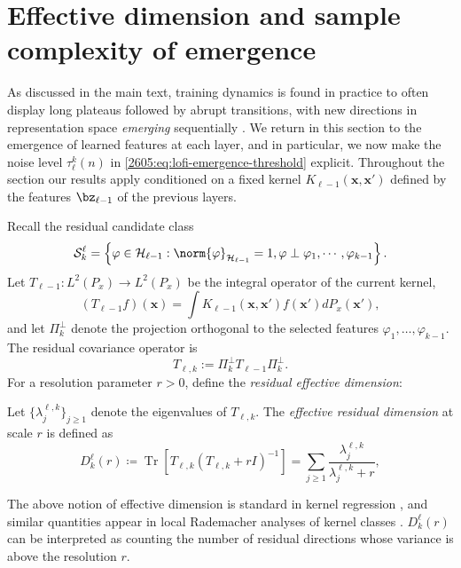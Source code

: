 \section{Effective dimension and sample complexity of emergence}

\label{2605:app:effective-dimension}

As discussed in the main text,  training dynamics is found in practice to often display long plateaus followed by abrupt transitions, with new directions in representation space \emph{emerging} sequentially \cite{wei2022emergent,raventos2023pretraining,arora2023theory,schaeffer2023are}. We return in this section to the emergence of learned features at each layer, and in particular, we now make the noise level \(\tau^k_\ell(n)\) in \eqref{2605:eq:lofi-emergence-threshold} explicit.  Throughout the section our results apply conditioned on a fixed kernel $K_{\ell-1}(\bm x,\bm x')$ defined by the features $\bz_{\ell-1}$ of the previous layers.

Recall the residual candidate class
\[
  \mathcal{S}^\ell_{k}
  =
  \left\{
  \varphi\in\mathcal H_{\ell-1}:
  \norm{\varphi}_{\mathcal H_{\ell-1}}=1, 
  \varphi \perp \varphi_1,\cdots, \varphi_{k-1}
  \right\}.
\]
Let \(T_{\ell-1}:L^2(P_x)\to L^2(P_x)\) be the integral operator of the current kernel,
\[
    (T_{\ell-1}f)(\bm x)
    =
    \int K_{\ell-1}(\bm x,\bm x')f(\bm x') dP_x(\bm x'),
\]
and let \(\Pi^\perp_k\) denote the projection orthogonal to the selected features \(\varphi_1,\dots,\varphi_{k-1}\). The residual covariance operator is
\[
    T_{\ell,k}
    :=
    \Pi^\perp_k T_{\ell-1}\Pi^\perp_k .
\]
For a resolution parameter \(r>0\), define the {\it residual effective dimension}:
\begin{definition}
    \label{2605:def:lofi-effective-dimension}
Let  \(\{\lambda^{\ell,k}_j\}_{j\geq 1}\) denote the eigenvalues of \(T_{\ell,k}\). The \emph{effective residual dimension} at scale \(r\) is defined as
    \begin{equation}
    D^\ell_k(r)
    \coloneqq
    \operatorname{Tr} \left[
        T_{\ell,k}(T_{\ell,k}+r I)^{-1}
    \right]
    =
    \sum_{j\geq 1}
    \frac{\lambda^{\ell,k}_j}{\lambda^{\ell,k}_j+r},
    \label{2605:eq:lofi-effective-dimension}
\end{equation}
\end{definition}
The above notion of effective dimension is standard in kernel regression
\cite{caponnetto2007optimal,rudi2017generalization}, and similar quantities
appear in local Rademacher analyses of kernel classes
\cite{mendelson2003performance,bartlett2005local}. \(D^\ell_k(r)\) can be
interpreted as counting the number of residual directions whose variance is
above the resolution \(r\).

